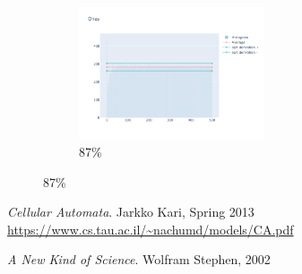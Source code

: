\documentclass[12pt, fleqn]{report}                             %
\theoremstyle{break}                                            %
\begin{document}
\begin{figure}[ht!]
\begin{subfigure}[b]{0.4\linewidth}
          \includegraphics[width=0.6\textwidth]{Images/110/dia-d.png}
          \caption{87\%}
        \end{subfigure}
      \end{figure}






















\begin{thebibliography}{10}

      \textit{Cellular Automata}. 
      Jarkko Kari, Spring 2013 \\
      \url{https://www.cs.tau.ac.il/~nachumd/models/CA.pdf}

      \textit{A New Kind of Science}. 
      Wolfram Stephen, 2002 \\

\end{thebibliography}
\end{document}
